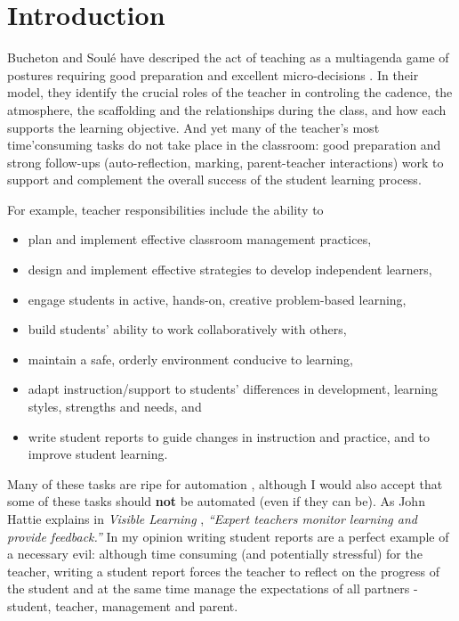 \documentclass[10pt]{article}
\begin{document}
\tableofcontents






\section{Introduction}

Bucheton and Soulé have descriped the act of teaching as a multiagenda game of postures requiring good preparation and excellent micro-decisions \cite{BS09}. In their model, they identify the crucial roles of the teacher in controling the cadence, the atmosphere, the scaffolding and the relationships during the class, and how each supports the learning objective. And yet many of the teacher's most time'consuming tasks do not take place in the classroom: good preparation and strong follow-ups (auto-reflection, marking, parent-teacher interactions) work to support and complement the overall success of the student learning process.

For example, teacher responsibilities include the ability to
\begin{itemize}
\item plan and implement effective classroom management practices,
\item design and implement effective strategies to develop independent learners,
\item engage students in active, hands-on, creative problem-based learning,
\item build students’ ability to work collaboratively with others,
\item maintain a safe, orderly environment conducive to learning,
\item adapt instruction/support to students’ differences in development, learning styles, strengths and needs, and
\item write student reports to guide changes in instruction and practice, and to improve student learning.
\end{itemize}

Many of these tasks are ripe for automation \cite{Swei15}, although I would also accept that some of these tasks should \textbf{not} be automated (even if they can be). As John Hattie explains in \emph{Visible Learning} \cite{Hat12}, \emph{``Expert teachers monitor learning and provide feedback.''} In my opinion writing student reports are a perfect example of a necessary evil: although time consuming (and potentially stressful) for the teacher, writing a student report forces the teacher to reflect on the progress of the student and at the same time manage the expectations of all partners - student, teacher, management and parent.
\end{document}

